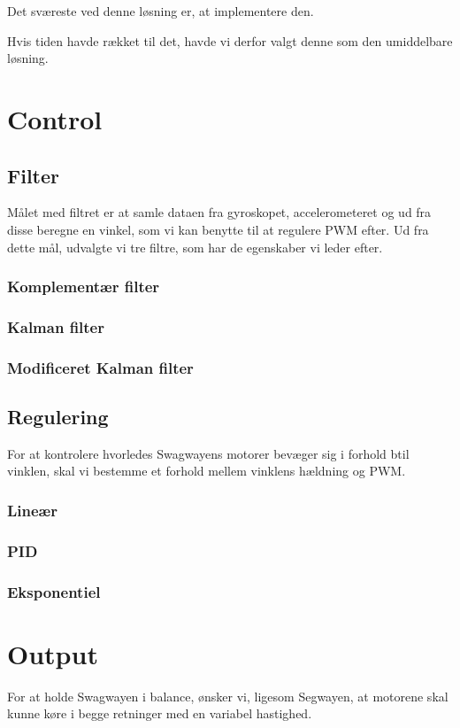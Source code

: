 \documentclass[a4paper,oneside,article,danish,table]{memoir}
\begin{document}
Det sværeste ved denne løsning er, at implementere den. 

Hvis tiden havde rækket til det, havde vi derfor valgt denne som den umiddelbare løsning.
\chapter{Control}
\section{Filter}\label{sec:filter}
Målet med filtret er at samle dataen fra gyroskopet, accelerometeret og ud fra disse beregne en vinkel, som vi kan benytte til at regulere PWM efter. Ud fra dette mål, udvalgte vi tre filtre, som har de egenskaber vi leder efter.
\subsection{Komplementær filter}
\subsection{Kalman filter}
\subsection{Modificeret Kalman filter}

\section{Regulering}
For at kontrolere hvorledes Swagwayens motorer bevæger sig i forhold btil vinklen, skal vi bestemme et forhold mellem vinklens hældning og PWM. 
\subsection{Lineær}
\subsection{PID}
\subsection{Eksponentiel}

\chapter{Output}
For at holde Swagwayen i balance, ønsker vi, ligesom Segwayen, at motorene skal kunne køre i begge retninger med en variabel hastighed.
\end{document}
